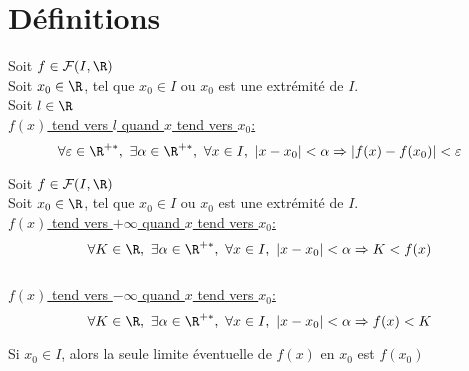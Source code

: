 \documentclass[12pt,twoside,a4paper]{article}
\author{MPSI 2}
\begin{document}
	\maketitle
	\section{Définitions}
		\begin{defi}
			Soit $f\in\mathcal{F}(I,\R)$\\
			Soit $x_0\in\R$, tel que $x_0\in I$ ou $x_0$ est une extrémité de $I$.\\
			Soit $l\in\R$\\
			\textbullet \underline{$f(x)$ tend vers $l$ quand $x$ tend vers $x_0$:}
			$$\forall \varepsilon\in\R^{+*},\ \exists \alpha \in \R^{+*},\ \forall x\in I,\ \left|x-x_0 \right|<\alpha \Rightarrow \left| f(x)-f(x_0)\right| <\varepsilon$$
		\end{defi}
		\begin{defi}
			Soit $f\in\mathcal{F}(I,\R)$\\
			Soit $x_0\in\R$, tel que $x_0\in I$ ou $x_0$ est une extrémité de $I$.\\
			\textbullet \underline{$f(x)$ tend vers $+\infty$ quand $x$ tend vers $x_0$:}
			$$\forall K\in\R,\ \exists \alpha \in \R^{+*},\ \forall x\in I,\ \left|x-x_0 \right|<\alpha \Rightarrow K<f(x)$$\\
			\textbullet \underline{$f(x)$ tend vers $-\infty$ quand $x$ tend vers $x_0$:}
			$$\forall K\in\R,\ \exists \alpha \in \R^{+*},\ \forall x\in I,\ \left|x-x_0 \right|<\alpha \Rightarrow f(x)<K$$
		\end{defi}
		\begin{prop}
			Si $x_0\in I$, alors la seule limite éventuelle de $f(x)$ en $x_0$ est $f(x_0)$
		\end{prop}
\end{document}
